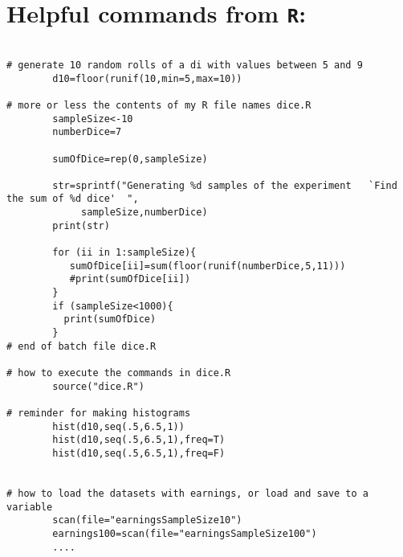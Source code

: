 \documentclass{report}
\begin{document}
\newpage


\section*{Helpful commands from {\tt R}:}

\bigskip

\begin{verbatim}

# generate 10 random rolls of a di with values between 5 and 9
        d10=floor(runif(10,min=5,max=10))               
                                   
# more or less the contents of my R file names dice.R                                                                               
        sampleSize<-10
        numberDice=7

        sumOfDice=rep(0,sampleSize)

        str=sprintf("Generating %d samples of the experiment   `Find the sum of %d dice'  ",
             sampleSize,numberDice)
        print(str)

        for (ii in 1:sampleSize){
           sumOfDice[ii]=sum(floor(runif(numberDice,5,11)))
           #print(sumOfDice[ii])
        }
        if (sampleSize<1000){
          print(sumOfDice)
        }
# end of batch file dice.R

# how to execute the commands in dice.R
        source("dice.R")
        
# reminder for making histograms
        hist(d10,seq(.5,6.5,1))        
        hist(d10,seq(.5,6.5,1),freq=T)
        hist(d10,seq(.5,6.5,1),freq=F)


# how to load the datasets with earnings, or load and save to a variable
        scan(file="earningsSampleSize10")
        earnings100=scan(file="earningsSampleSize100")
        ....

\end{verbatim}
\end{document}
